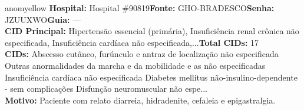 \documentclass[a4paper,10pt]{article}
\begin{document}
\begin{anomalycard}[Interna\c{c}\~{a}o \#118943 | Pac. \#84405 | MODERADO (z=2.11) | LOS: 22d | 01/03/2026\,$\to$\,—]{anomyellow}
\textbf{Hospital:} Hospital \#90819\quad \textbf{Fonte:} GHO-BRADESCO\quad \textbf{Senha:} JZUUXWO\quad \textbf{Guia:} ---\\

\textbf{CID Principal:} {\small Hipertensão essencial (primária), Insuficiência renal crônica não especificada, Insuficiência cardíaca não especificada,...}\quad\textbf{Total CIDs:} 17\\

\textbf{CIDs:} {\scriptsize Abscesso cutâneo, furúnculo e antraz de localização não especificada \textbar{} Outras anormalidades da marcha e da mobilidade e as não especificadas \textbar{} Insuficiência cardíaca não especificada \textbar{} Diabetes mellitus não-insulino-dependente - sem complicações \textbar{} Disfunção neuromuscular não espe...}\\

\textbf{Motivo:} {\scriptsize Paciente com relato diarreia, hidradenite, cefaleia e epigastralgia.}\\




\end{anomalycard}
\end{document}
